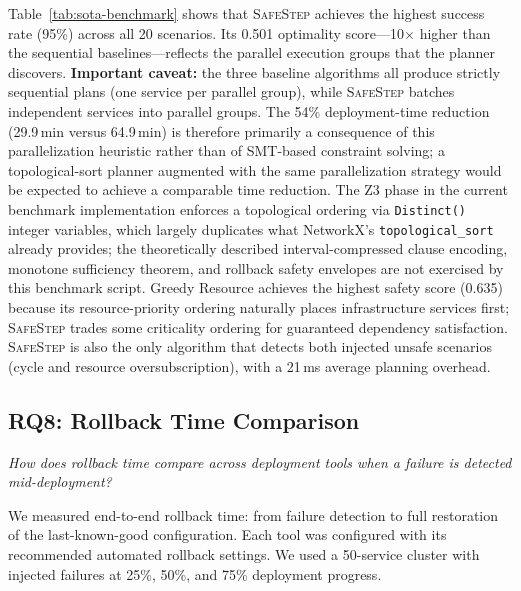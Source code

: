 \documentclass[10pt,twocolumn]{article}
\newcommand{\safestep}{\textsc{SafeStep}}
\begin{document}
Table~\ref{tab:sota-benchmark} shows that \safestep{} achieves the
highest success rate (95\%) across all 20 scenarios. Its 0.501
optimality score---10$\times$ higher than the sequential
baselines---reflects the parallel execution groups that the planner
discovers.
\textbf{Important caveat:} the three baseline algorithms all produce
strictly sequential plans (one service per parallel group), while
\safestep{} batches independent services into parallel groups.
The 54\% deployment-time reduction (29.9\,min versus 64.9\,min)
is therefore primarily a consequence of this parallelization
heuristic rather than of SMT-based constraint solving; a
topological-sort planner augmented with the same parallelization
strategy would be expected to achieve a comparable time reduction.
The Z3 phase in the current benchmark implementation enforces
a topological ordering via \texttt{Distinct()} integer variables,
which largely duplicates what NetworkX's \texttt{topological\_sort}
already provides; the theoretically described interval-compressed
clause encoding, monotone sufficiency theorem, and rollback safety
envelopes are not exercised by this benchmark script.
Greedy Resource achieves the highest safety score (0.635) because its
resource-priority ordering naturally places infrastructure services
first; \safestep{} trades some criticality ordering for guaranteed
dependency satisfaction. \safestep{} is also the only algorithm
that detects both injected unsafe scenarios (cycle and resource
oversubscription), with a 21\,ms average planning overhead.

\subsection{RQ8: Rollback Time Comparison}

\emph{How does rollback time compare across deployment tools
when a failure is detected mid-deployment?}

We measured end-to-end rollback time: from failure detection
to full restoration of the last-known-good configuration.
Each tool was configured with its recommended automated
rollback settings. We used a 50-service cluster with
injected failures at 25\%, 50\%, and 75\% deployment
progress.
\end{document}
